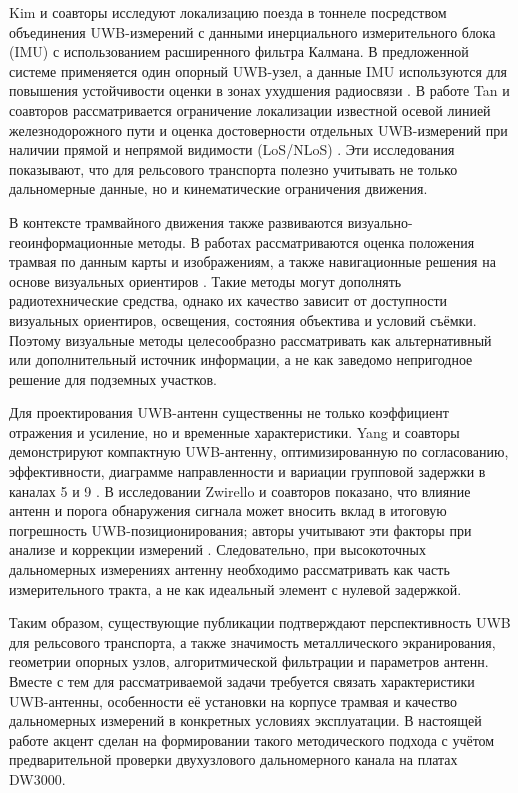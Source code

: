 \documentclass{misisarticle}
\begin{document}
Kim и соавторы исследуют локализацию поезда в тоннеле посредством объединения UWB-измерений с данными инерциального измерительного блока (IMU) с использованием расширенного фильтра Калмана. В предложенной системе применяется один опорный UWB-узел, а данные IMU используются для повышения устойчивости оценки в зонах ухудшения радиосвязи \cite{kim2025uwbimu}. В работе Tan и соавторов рассматривается ограничение локализации известной осевой линией железнодорожного пути и оценка достоверности отдельных UWB-измерений при наличии прямой и непрямой видимости (LoS/NLoS) \cite{tan2026track}. Эти исследования показывают, что для рельсового транспорта полезно учитывать не только дальномерные данные, но и кинематические ограничения движения.

В контексте трамвайного движения также развиваются визуально-геоинформационные методы. В работах \cite{ali2025,guzhva2023} рассматриваются оценка положения трамвая по данным карты и изображениям, а также навигационные решения на основе визуальных ориентиров \cite{bikmaev2020}. Такие методы могут дополнять радиотехнические средства, однако их качество зависит от доступности визуальных ориентиров, освещения, состояния объектива и условий съёмки. Поэтому визуальные методы целесообразно рассматривать как альтернативный или дополнительный источник информации, а не как заведомо непригодное решение для подземных участков.

Для проектирования UWB-антенн существенны не только коэффициент отражения и усиление, но и временные характеристики. Yang и соавторы демонстрируют компактную UWB-антенну, оптимизированную по согласованию, эффективности, диаграмме направленности и вариации групповой задержки в каналах 5 и 9 \cite{yang2022antenna}. В исследовании Zwirello и соавторов показано, что влияние антенн и порога обнаружения сигнала может вносить вклад в итоговую погрешность UWB-позиционирования; авторы учитывают эти факторы при анализе и коррекции измерений \cite{zwirello2012uwb}. Следовательно, при высокоточных дальномерных измерениях антенну необходимо рассматривать как часть измерительного тракта, а не как идеальный элемент с нулевой задержкой.

Таким образом, существующие публикации подтверждают перспективность UWB для рельсового транспорта, а также значимость металлического экранирования, геометрии опорных узлов, алгоритмической фильтрации и параметров антенн. Вместе с тем для рассматриваемой задачи требуется связать характеристики UWB-антенны, особенности её установки на корпусе трамвая и качество дальномерных измерений в конкретных условиях эксплуатации. В настоящей работе акцент сделан на формировании такого методического подхода с учётом предварительной проверки двухузлового дальномерного канала на платах DW3000.
\end{document}
